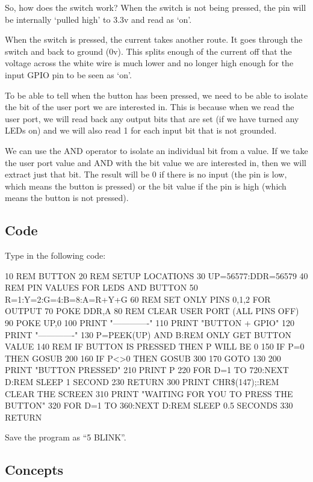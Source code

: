 So, how does the switch work?  When the switch is not being pressed, the pin will be internally `pulled high' to 3.3v and read as `on'.

When the switch is pressed, the current takes another route.  It goes through the switch and back to ground (0v).  This splits enough of the current off that the voltage across the white wire is much lower and no longer high enough for the input GPIO pin to be seen as `on'.

To be able to tell when the button has been pressed, we need to be able to isolate the bit of the user port we are interested in.  This is because when we read the user port, we will read back any output bits that are set (if we have turned any LEDs on) and we will also read 1 for each input bit that is not grounded.

We can use the AND operator to isolate an individual bit from a value.  If we take the user port value and AND with the bit value we are interested in, then we will extract just that bit.  The result will be 0 if there is no input (the pin is low, which means the button is pressed) or the bit value if the pin is high (which means the button is not pressed).

\subsection*{Code}

Type in the following code:
\begin{basic}
10 REM BUTTON
20 REM SETUP LOCATIONS
30 UP=56577:DDR=56579
40 REM PIN VALUES FOR LEDS AND BUTTON
50 R=1:Y=2:G=4:B=8:A=R+Y+G
60 REM SET ONLY PINS 0,1,2 FOR OUTPUT
70 POKE DDR,A
80 REM CLEAR USER PORT (ALL PINS OFF)
90 POKE UP,0
100 PRINT "-------------"
110 PRINT "BUTTON + GPIO"
120 PRINT "-------------"
130 P=PEEK(UP) AND B:REM ONLY GET BUTTON VALUE
140 REM IF BUTTON IS PRESSED THEN P WILL BE 0
150 IF P=0 THEN GOSUB 200
160 IF P<>0 THEN GOSUB 300
170 GOTO 130
200 PRINT "BUTTON PRESSED"
210 PRINT P
220 FOR D=1 TO 720:NEXT D:REM SLEEP 1 SECOND
230 RETURN
300 PRINT CHR\$(147);:REM CLEAR THE SCREEN
310 PRINT "WAITING FOR YOU TO PRESS THE BUTTON"
320 FOR D=1 TO 360:NEXT D:REM SLEEP 0.5 SECONDS
330 RETURN
\end{basic}

Save the program as ``5 BLINK''.

\subsection*{Concepts}

